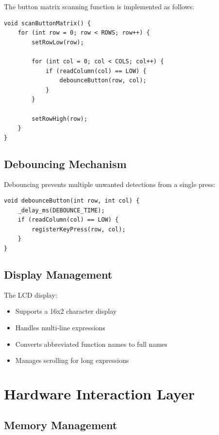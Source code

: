 \documentclass[journal]{IEEEtran}
\numberwithin{equation}{enumi}
\numberwithin{figure}{enumi}
\begin{document}
The button matrix scanning function is implemented as follows:

\begin{lstlisting}[caption=Button Matrix Scanning, label=lst:buttonmatrix]
void scanButtonMatrix() {
    for (int row = 0; row < ROWS; row++) {
        setRowLow(row);
        
        for (int col = 0; col < COLS; col++) {
            if (readColumn(col) == LOW) {
                debounceButton(row, col);
            }
        }
        
        setRowHigh(row);
    }
}
\end{lstlisting}

\subsection{Debouncing Mechanism}

Debouncing prevents multiple unwanted detections from a single press:

\begin{lstlisting}[caption=Debounce Function, label=lst:debounce]
void debounceButton(int row, int col) {
    _delay_ms(DEBOUNCE_TIME);
    if (readColumn(col) == LOW) {
        registerKeyPress(row, col);
    }
}
\end{lstlisting}

\subsection{Display Management}

The LCD display:

\begin{itemize}
    \item Supports a 16x2 character display
    \item Handles multi-line expressions
    \item Converts abbreviated function names to full names
    \item Manages scrolling for long expressions
\end{itemize}

\section{Hardware Interaction Layer}

\subsection{Memory Management}
\end{document}
